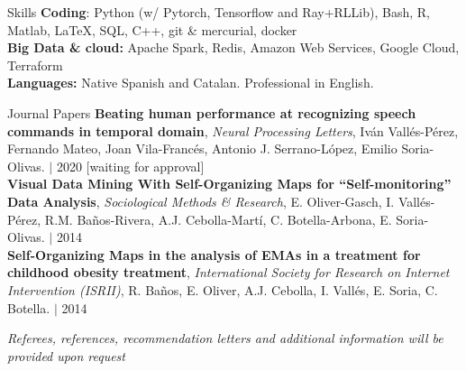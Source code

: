\documentclass{resume} %
\begin{document}


\begin{rSection}{Skills} \itemsep -3pt
{\textbf{Coding}: Python (w/ Pytorch, Tensorflow and Ray+RLLib), Bash, R, Matlab, \LaTeX, SQL, C++, git \& mercurial, docker}  \\
{\textbf{Big Data \& cloud:} Apache Spark, Redis, Amazon Web Services, Google Cloud, Terraform} \\
{\textbf{Languages:} Native Spanish and Catalan. Professional in English.}
\end{rSection}



\begin{rSection}{Journal Papers}
{\textbf{Beating human performance at recognizing speech commands in temporal domain}, \textit{Neural Processing Letters}, Iván Vallés-Pérez, Fernando Mateo, Joan Vila-Francés, Antonio J. Serrano-López, Emilio Soria-Olivas. $|$  {2020} [waiting for approval]}\\
{\textbf{Visual Data Mining With Self-Organizing Maps for ``Self-monitoring'' Data Analysis}, \textit{Sociological Methods \& Research}, E. Oliver-Gasch, I. Vallés-Pérez, R.M. Baños-Rivera, A.J. Cebolla-Martí, C. Botella-Arbona, E. Soria-Olivas. $|$  {2014}}\\
{\textbf{Self-Organizing Maps in the analysis of EMAs in a treatment for childhood obesity treatment}, \textit{International Society for Research on Internet Intervention (ISRII)}, R. Baños, E. Oliver, A.J. Cebolla, I. Vallés, E. Soria, C. Botella.  $|$  {2014}}

\end{rSection}

\vspace{\fill}
\begin{flushright}
	\small{\textit{Referees, references, recommendation letters and additional information will be provided upon request}}
\end{flushright}
\end{document}
